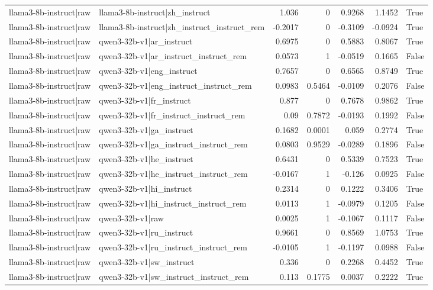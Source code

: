 \begin{table}
\begin{tabular}{l l r r r r l}
llama3-8b-instruct|raw & llama3-8b-instruct|zh_instruct & 1.036 & 0 & 0.9268 & 1.1452 & True \\
llama3-8b-instruct|raw & llama3-8b-instruct|zh_instruct_instruct_rem & -0.2017 & 0 & -0.3109 & -0.0924 & True \\
llama3-8b-instruct|raw & qwen3-32b-v1|ar_instruct & 0.6975 & 0 & 0.5883 & 0.8067 & True \\
llama3-8b-instruct|raw & qwen3-32b-v1|ar_instruct_instruct_rem & 0.0573 & 1 & -0.0519 & 0.1665 & False \\
llama3-8b-instruct|raw & qwen3-32b-v1|eng_instruct & 0.7657 & 0 & 0.6565 & 0.8749 & True \\
llama3-8b-instruct|raw & qwen3-32b-v1|eng_instruct_instruct_rem & 0.0983 & 0.5464 & -0.0109 & 0.2076 & False \\
llama3-8b-instruct|raw & qwen3-32b-v1|fr_instruct & 0.877 & 0 & 0.7678 & 0.9862 & True \\
llama3-8b-instruct|raw & qwen3-32b-v1|fr_instruct_instruct_rem & 0.09 & 0.7872 & -0.0193 & 0.1992 & False \\
llama3-8b-instruct|raw & qwen3-32b-v1|ga_instruct & 0.1682 & 0.0001 & 0.059 & 0.2774 & True \\
llama3-8b-instruct|raw & qwen3-32b-v1|ga_instruct_instruct_rem & 0.0803 & 0.9529 & -0.0289 & 0.1896 & False \\
llama3-8b-instruct|raw & qwen3-32b-v1|he_instruct & 0.6431 & 0 & 0.5339 & 0.7523 & True \\
llama3-8b-instruct|raw & qwen3-32b-v1|he_instruct_instruct_rem & -0.0167 & 1 & -0.126 & 0.0925 & False \\
llama3-8b-instruct|raw & qwen3-32b-v1|hi_instruct & 0.2314 & 0 & 0.1222 & 0.3406 & True \\
llama3-8b-instruct|raw & qwen3-32b-v1|hi_instruct_instruct_rem & 0.0113 & 1 & -0.0979 & 0.1205 & False \\
llama3-8b-instruct|raw & qwen3-32b-v1|raw & 0.0025 & 1 & -0.1067 & 0.1117 & False \\
llama3-8b-instruct|raw & qwen3-32b-v1|ru_instruct & 0.9661 & 0 & 0.8569 & 1.0753 & True \\
llama3-8b-instruct|raw & qwen3-32b-v1|ru_instruct_instruct_rem & -0.0105 & 1 & -0.1197 & 0.0988 & False \\
llama3-8b-instruct|raw & qwen3-32b-v1|sw_instruct & 0.336 & 0 & 0.2268 & 0.4452 & True \\
llama3-8b-instruct|raw & qwen3-32b-v1|sw_instruct_instruct_rem & 0.113 & 0.1775 & 0.0037 & 0.2222 & True \\

\end{tabular}
\end{table}
